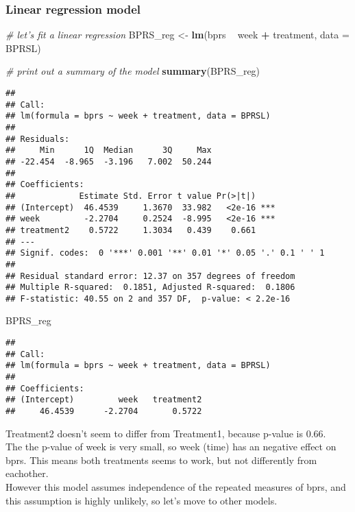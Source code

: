 \documentclass[]{article}
\newenvironment{Shaded}{\begin{snugshade}}{\end{snugshade}}
\newcommand{\KeywordTok}[1]{\textcolor[rgb]{0.13,0.29,0.53}{\textbf{#1}}}
\newcommand{\DataTypeTok}[1]{\textcolor[rgb]{0.13,0.29,0.53}{#1}}
\newcommand{\StringTok}[1]{\textcolor[rgb]{0.31,0.60,0.02}{#1}}
\newcommand{\CommentTok}[1]{\textcolor[rgb]{0.56,0.35,0.01}{\textit{#1}}}
\newcommand{\OperatorTok}[1]{\textcolor[rgb]{0.81,0.36,0.00}{\textbf{#1}}}
\newcommand{\NormalTok}[1]{#1}
\begin{document}
\subsubsection{Linear regression model}\label{linear-regression-model}

\begin{Shaded}
\begin{Highlighting}[]
\CommentTok{# let's fit a linear regression}
\NormalTok{BPRS_reg <-}\StringTok{ }\KeywordTok{lm}\NormalTok{(bprs }\OperatorTok{~}\StringTok{ }\NormalTok{week }\OperatorTok{+}\StringTok{ }\NormalTok{treatment, }\DataTypeTok{data =}\NormalTok{ BPRSL)}

\CommentTok{# print out a summary of the model}
\KeywordTok{summary}\NormalTok{(BPRS_reg)}
\end{Highlighting}
\end{Shaded}

\begin{verbatim}
## 
## Call:
## lm(formula = bprs ~ week + treatment, data = BPRSL)
## 
## Residuals:
##     Min      1Q  Median      3Q     Max 
## -22.454  -8.965  -3.196   7.002  50.244 
## 
## Coefficients:
##             Estimate Std. Error t value Pr(>|t|)    
## (Intercept)  46.4539     1.3670  33.982   <2e-16 ***
## week         -2.2704     0.2524  -8.995   <2e-16 ***
## treatment2    0.5722     1.3034   0.439    0.661    
## ---
## Signif. codes:  0 '***' 0.001 '**' 0.01 '*' 0.05 '.' 0.1 ' ' 1
## 
## Residual standard error: 12.37 on 357 degrees of freedom
## Multiple R-squared:  0.1851, Adjusted R-squared:  0.1806 
## F-statistic: 40.55 on 2 and 357 DF,  p-value: < 2.2e-16
\end{verbatim}

\begin{Shaded}
\begin{Highlighting}[]
\NormalTok{BPRS_reg}
\end{Highlighting}
\end{Shaded}

\begin{verbatim}
## 
## Call:
## lm(formula = bprs ~ week + treatment, data = BPRSL)
## 
## Coefficients:
## (Intercept)         week   treatment2  
##     46.4539      -2.2704       0.5722
\end{verbatim}

Treatment2 doesn't seem to differ from Treatment1, because p-value is
0.66.\\
The the p-value of week is very small, so week (time) has an negative
effect on bprs. This means both treatments seems to work, but not
differently from eachother.\\
However this model assumes independence of the repeated measures of
bprs, and this assumption is highly unlikely, so let's move to other
models.
\end{document}
